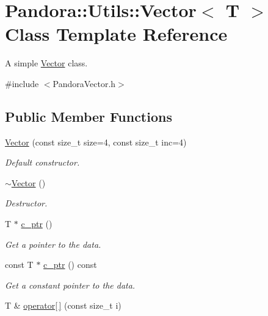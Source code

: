 \hypertarget{classPandora_1_1Utils_1_1Vector}{
\section{Pandora::Utils::Vector$<$ T $>$ Class Template Reference}
\label{classPandora_1_1Utils_1_1Vector}
}


A simple \hyperlink{classPandora_1_1Utils_1_1Vector}{Vector} class.  


{\ttfamily \#include $<$PandoraVector.h$>$}\subsection*{Public Member Functions}
\begin{DoxyCompactItemize}
\item 
\hyperlink{classPandora_1_1Utils_1_1Vector_a08c4f102c57e56cabbca1c15e8c17122}{Vector} (const size\_\-t size=4, const size\_\-t inc=4)
\begin{DoxyCompactList}\small\item\em Default constructor. \item\end{DoxyCompactList}\item 
\hyperlink{classPandora_1_1Utils_1_1Vector_ab2688a6e46b857ad4756d21adadb0a20}{$\sim$Vector} ()
\begin{DoxyCompactList}\small\item\em Destructor. \item\end{DoxyCompactList}\item 
T $\ast$ \hyperlink{classPandora_1_1Utils_1_1Vector_a6392a54fb8c8e1dc9e6f1128f7b8cb03}{c\_\-ptr} ()
\begin{DoxyCompactList}\small\item\em Get a pointer to the data. \item\end{DoxyCompactList}\item 
const T $\ast$ \hyperlink{classPandora_1_1Utils_1_1Vector_ac3306d38479a1ae6e28eadd9f346f8fa}{c\_\-ptr} () const 
\begin{DoxyCompactList}\small\item\em Get a constant pointer to the data. \item\end{DoxyCompactList}\item 
T \& \hyperlink{classPandora_1_1Utils_1_1Vector_a00d84e3e6da7b22d5324e47e903f9e93}{operator\mbox{[}$\,$\mbox{]}} (const size\_\-t i)

\end{DoxyCompactItemize}
